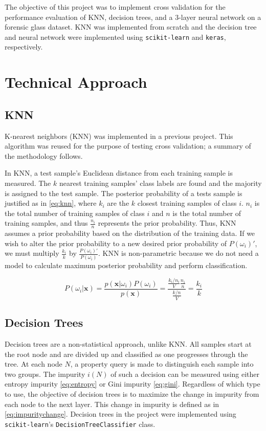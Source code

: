 \documentclass[paper=a4, fontsize=11pt,twoside]{scrartcl}	%
\begin{document}
The objective of this project was to implement cross validation for the performance evaluation of KNN, decision trees, and a 3-layer neural network on a forensic glass dataset. KNN was implemented from scratch and the decision tree and neural network were implemented using \texttt{scikit-learn} and \texttt{keras}, respectively.


\section{Technical Approach}

\subsection{KNN}
K-nearest neighbors (KNN) was implemented in a previous project. This algorithm was reused for the purpose of testing cross validation; a summary of the methodology follows.

In KNN, a test sample's Euclidean distance from each training sample is measured. The $k$ nearest training samples' class labels are found and the majority is assigned to the test sample. The posterior probability of a tests sample is justified as in \eqref{eq:knn}, where $k_i$ are the $k$ closest training samples of class $i$. $n_i$ is the total number of training samples of class $i$ and $n$ is the total number of training samples, and thus $\frac{n_i}{n}$ represents the prior probability. Thus, KNN assumes a prior probability based on the distribution of the training data. If we wish to alter the prior probability to a new desired prior probability of $P(\omega_i)'$, we must multiply $\frac{k_i}{k}$ by $\frac{P(\omega_i)'}{P(\omega_i)}$. KNN is non-parametric because we do not need a model to calculate maximum posterior probability and perform classification.

\begin{equation}
\label{eq:knn}
P(\omega_{i}|\mathbf{x}) = \frac{p(\mathbf{x}|\omega_{i})P(\omega_{i})}{p(\mathbf{x})}
= \frac{\frac{k_i/n_i}{V}\frac{n_i}{n}}{\frac{k/n}{V}} = \frac{k_i}{k}
\end{equation}


\subsection{Decision Trees}
Decision trees are a non-statistical approach, unlike KNN. All samples start at the root node and are divided up and classified as one progresses through the tree. At each node $N$, a property query is made to distinguish each sample into two groups. The impurity $i(N)$ of such a decision can be measured using either entropy impurity \eqref{eq:entropy} or Gini impurity \eqref{eq:gini}. Regardless of which type to use, the objective of decision trees is to maximize the change in impurity from each node to the next layer. This change in impurity is defined as in \eqref{eq:impuritychange}. Decision trees in the project were implemented using \texttt{scikit-learn}'s \texttt{DecisionTreeClassifier} class.
\end{document}
